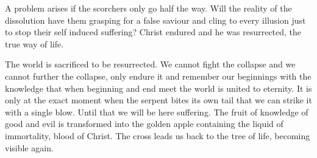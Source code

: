 \begin{footnotesize}
\begin{sffamily}
A problem arises if the scorchers only go half the way. Will the reality of the dissolution have them grasping for a false saviour and cling to every illusion just to stop their self induced suffering? Christ endured and he was resurrected, the true way of life.

The world is sacrificed to be resurrected. We cannot fight the collapse and we cannot further the collapse, only endure it and remember our beginnings with the knowledge that when beginning and end meet the world is united to eternity. It is only at the exact moment when the serpent bites its own tail that we can strike it with a single blow. Until that we will be here suffering. The fruit of knowledge of good and evil is transformed into the golden apple containing the liquid of immortality, blood of Christ. The cross leads us back to the tree of life, becoming visible again.

\hfill

\end{sffamily}
\end{footnotesize}

